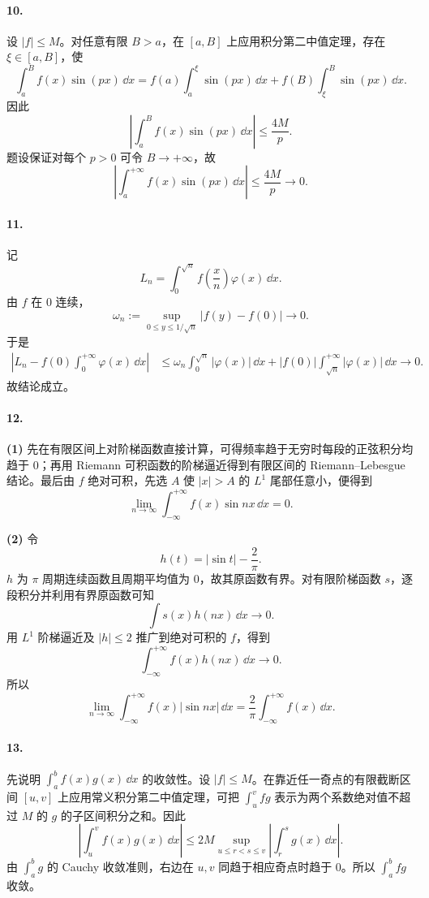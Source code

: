\paragraph{10.}
设 $|f|\leq M$。对任意有限 $B>a$，在 $[a,B]$ 上应用积分第二中值定理，存在 $\xi\in[a,B]$，使
\[
  \int_a^B f(x)\sin(px)\,\dd x
  =f(a)\int_a^\xi\sin(px)\,\dd x
   +f(B)\int_\xi^B\sin(px)\,\dd x.
\]
因此
\[
  \left|\int_a^B f(x)\sin(px)\,\dd x\right|
  \leq\frac{4M}{p}.
\]
题设保证对每个 $p>0$ 可令 $B\to+\infty$，故
\[
  \left|\int_a^{+\infty}f(x)\sin(px)\,\dd x\right|\leq\frac{4M}{p}\to0.
\]

\paragraph{11.}
记
\[
  L_n=\int_0^{\sqrt n}f\left(\frac xn\right)\varphi(x)\,\dd x.
\]
由 $f$ 在 $0$ 连续，
\[
  \omega_n:=\sup_{0\leq y\leq1/\sqrt n}|f(y)-f(0)|\to0.
\]
于是
\begin{align*}
  \left|L_n-f(0)\int_0^{+\infty}\varphi(x)\,\dd x\right|
  &\leq \omega_n\int_0^{\sqrt n}|\varphi(x)|\,\dd x
  +|f(0)|\int_{\sqrt n}^{+\infty}|\varphi(x)|\,\dd x\to0.
\end{align*}
故结论成立。

\paragraph{12.}
\textbf{(1)} 先在有限区间上对阶梯函数直接计算，可得频率趋于无穷时每段的正弦积分均趋于 $0$；再用 Riemann 可积函数的阶梯逼近得到有限区间的 Riemann--Lebesgue 结论。最后由 $f$ 绝对可积，先选 $A$ 使 $|x|>A$ 的 $L^1$ 尾部任意小，便得到
\[
  \boxed{\lim_{n\to\infty}\int_{-\infty}^{+\infty}f(x)\sin nx\,\dd x=0}.
\]

\textbf{(2)} 令
\[
  h(t)=|\sin t|-\frac2\pi.
\]
$h$ 为 $\pi$ 周期连续函数且周期平均值为 $0$，故其原函数有界。对有限阶梯函数 $s$，逐段积分并利用有界原函数可知
\[
  \int s(x)h(nx)\,\dd x\to0.
\]
用 $L^1$ 阶梯逼近及 $|h|\leq2$ 推广到绝对可积的 $f$，得到
\[
  \int_{-\infty}^{+\infty}f(x)h(nx)\,\dd x\to0.
\]
所以
\[
  \boxed{\lim_{n\to\infty}\int_{-\infty}^{+\infty}f(x)|\sin nx|\,\dd x
  =\frac2\pi\int_{-\infty}^{+\infty}f(x)\,\dd x}.
\]

\paragraph{13.}
先说明 $\int_a^b f(x)g(x)\,\dd x$ 的收敛性。设 $|f|\leq M$。在靠近任一奇点的有限截断区间 $[u,v]$ 上应用常义积分第二中值定理，可把
$\int_u^v fg$ 表示为两个系数绝对值不超过 $M$ 的 $g$ 的子区间积分之和。因此
\[
  \left|\int_u^v f(x)g(x)\,\dd x\right|
  \leq2M\sup_{u\leq r<s\leq v}\left|\int_r^s g(x)\,\dd x\right|.
\]
由 $\int_a^b g$ 的 Cauchy 收敛准则，右边在 $u,v$ 同趋于相应奇点时趋于 $0$。所以 $\int_a^b fg$ 收敛。

